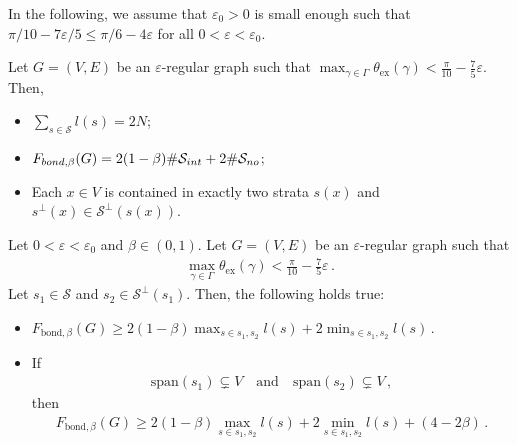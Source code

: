 \documentclass[10pt,a4paper]{amsart}
\newcommand{\eps}{\varepsilon}
\begin{document}
\begin{remark}\label{rem: eps}
In the following, we assume that $\varepsilon_0>0$ is small enough such that $ \pi/10 - 7\varepsilon/5  \leq  \pi/6-  4\varepsilon$ for all $0  < \eps < \eps_0$.  
\end{remark}

\begin{lemma}\label{lemma:opengraph}  Let $G=(V,E)$ be an $\eps$-regular graph such that $ \max_{\gamma \in \Gamma} \theta_{\mathrm{ex}}(\gamma) < \frac{\pi}{10}-  \frac{7}{5} \eps$.  Then,  
\begin{itemize}
\item[\rm (i)]  $\sum_{s \in \mathcal{S}} l(s) =2N$;
\item[\rm (ii)] $ F_{\rm bond, \beta} (G)  = 2(1-\beta) \#\mathcal{S}_{\rm int} + 2\# \mathcal{S}_{\rm no}$;
\item[\rm (iii)] Each $x\in V$ is contained in exactly two strata $s(x)$ and $s^\perp(x) \in \mathcal{S}^\perp(s(x))$. 
\end{itemize}
\end{lemma}

\begin{lemma}\label{lem:orthogonalstrata} Let $0 <\eps < \eps_0  $ and $\beta \in (0,1)$. Let  $G=(V,E)$ be an $\eps$-regular graph such that
\begin{align}\label{eq: smalli}
 \max_{\gamma \in \Gamma} \theta_{\mathrm{ex}}(\gamma) < \frac{\pi}{10}-  \frac{7}{5} \eps  \,.
\end{align}
Let $s_1 \in \mathcal{S}$ and $s_2 \in \mathcal{S}^\perp(s_1)$.  Then, the following holds true:
\begin{itemize}
\item[{\rm (i)}] $ F_{\mathrm{bond}, \beta }  (G) \geq 2(1-\beta) \max_{s \in s_1,s_2} l(s) + 2\min_{s \in s_1,s_2} l(s)$\,.
\item[{\rm (ii)}] If 
\begin{align}\label{incl:nospan}
\mathrm{span}(s_1)\subsetneq V  \quad \text{and}\quad \mathrm{span}(s_2)\subsetneq  V   \,,
\end{align}
then 
\begin{align*}
 F_{\mathrm{bond},\beta}  (G) \geq 2(1-\beta) \max_{s \in s_1,s_2} l(s) + 2\min_{s \in s_1,s_2} l(s) + (4- 2  \beta) \,.
\end{align*} 
\end{itemize}
\end{lemma}
\end{document}
